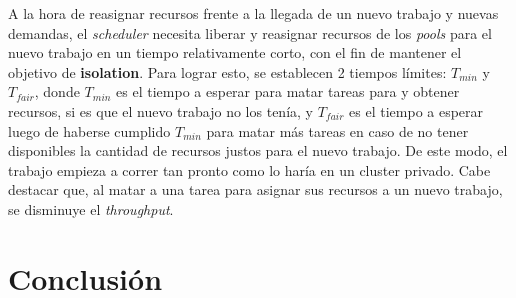 \documentclass[a4paper]{article}
\begin{document}
A la hora de reasignar recursos frente a la llegada de un nuevo trabajo y
nuevas demandas, el \textit{scheduler} necesita liberar y reasignar recursos de
los \textit{pools} para el nuevo trabajo en un tiempo relativamente corto, con
el fin de mantener el objetivo de \textbf{isolation}. Para lograr esto, se
establecen 2 tiempos límites: $T_{min}$ y $T_{fair}$, donde $T_{min}$ es el
tiempo a esperar para matar tareas para y obtener recursos, si es que el nuevo
trabajo no los tenía, y $T_{fair}$ es el tiempo a esperar luego de haberse
cumplido $T_{min}$ para matar más tareas en caso de no tener disponibles la
cantidad de recursos justos para el nuevo trabajo. De este modo, el trabajo
empieza a correr tan pronto como lo haría en un cluster privado. Cabe destacar
que, al matar a una tarea para asignar sus recursos a un nuevo trabajo, se
disminuye el \textit{throughput}.



\newpage
\section{Conclusión}
\end{document}
